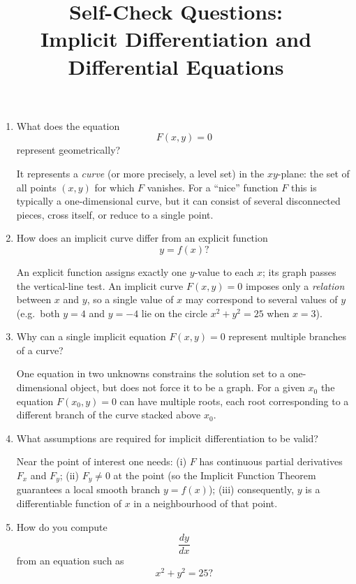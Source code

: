 \documentclass{self-check}
\title{Self-Check Questions:\\Implicit Differentiation and Differential Equations}
\author{}
\date{}
\begin{document}
\maketitle

\begin{enumerate}[leftmargin=*, itemsep=8pt]
  \item What does the equation
    \[ F(x,y)=0 \]
    represent geometrically?

    \begin{answer}
      It represents a \emph{curve} (or more precisely, a level set) in the \(xy\)-plane: the set of all points \((x,y)\) for which \(F\) vanishes. For a ``nice'' function \(F\) this is typically a one-dimensional curve, but it can consist of several disconnected pieces, cross itself, or reduce to a single point.
    \end{answer}
  \item How does an implicit curve differ from an explicit function
    \[ y=f(x)? \]

    \begin{answer}
      An explicit function assigns exactly one \(y\)-value to each \(x\); its graph passes the vertical-line test. An implicit curve \(F(x,y)=0\) imposes only a \emph{relation} between \(x\) and \(y\), so a single value of \(x\) may correspond to several values of \(y\) (e.g.\ both \(y=4\) and \(y=-4\) lie on the circle \(x^{2}+y^{2}=25\) when \(x=3\)).
    \end{answer}
  \item Why can a single implicit equation \(F(x,y)=0\) represent multiple branches of a curve?

    \begin{answer}
      One equation in two unknowns constrains the solution set to a one-dimensional object, but does not force it to be a graph. For a given \(x_{0}\) the equation \(F(x_{0},y)=0\) can have multiple roots, each root corresponding to a different branch of the curve stacked above \(x_{0}\).
    \end{answer}
  \item What assumptions are required for implicit differentiation to be valid?

    \begin{answer}
      Near the point of interest one needs: (i) \(F\) has continuous partial derivatives \(F_{x}\) and \(F_{y}\); (ii) \(F_{y}\neq 0\) at the point (so the Implicit Function Theorem guarantees a local smooth branch \(y=f(x)\)); (iii) consequently, \(y\) is a differentiable function of \(x\) in a neighbourhood of that point.
    \end{answer}
  \item How do you compute
    \[ \frac{dy}{dx} \]
    from an equation such as
    \[ x^{2}+y^{2}=25? \]


\end{enumerate}
\end{document}
